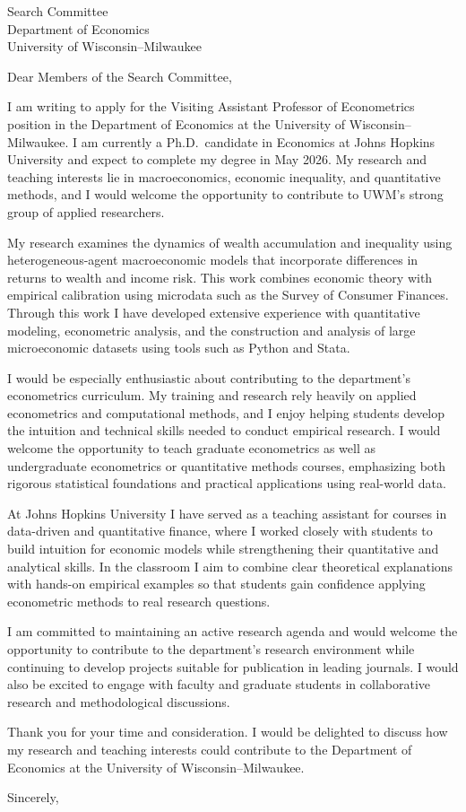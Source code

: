 \documentclass[11pt]{letter}
\begin{document}
\begin{letter}{Search Committee \\
Department of Economics \\
University of Wisconsin--Milwaukee}

\opening{Dear Members of the Search Committee,}

I am writing to apply for the Visiting Assistant Professor of Econometrics position in the Department of Economics at the University of Wisconsin--Milwaukee. I am currently a Ph.D.\ candidate in Economics at Johns Hopkins University and expect to complete my degree in May 2026. My research and teaching interests lie in macroeconomics, economic inequality, and quantitative methods, and I would welcome the opportunity to contribute to UWM’s strong group of applied researchers.

My research examines the dynamics of wealth accumulation and inequality using heterogeneous-agent macroeconomic models that incorporate differences in returns to wealth and income risk. This work combines economic theory with empirical calibration using microdata such as the Survey of Consumer Finances. Through this work I have developed extensive experience with quantitative modeling, econometric analysis, and the construction and analysis of large microeconomic datasets using tools such as Python and Stata.

I would be especially enthusiastic about contributing to the department’s econometrics curriculum. My training and research rely heavily on applied econometrics and computational methods, and I enjoy helping students develop the intuition and technical skills needed to conduct empirical research. I would welcome the opportunity to teach graduate econometrics as well as undergraduate econometrics or quantitative methods courses, emphasizing both rigorous statistical foundations and practical applications using real-world data.

At Johns Hopkins University I have served as a teaching assistant for courses in data-driven and quantitative finance, where I worked closely with students to build intuition for economic models while strengthening their quantitative and analytical skills. In the classroom I aim to combine clear theoretical explanations with hands-on empirical examples so that students gain confidence applying econometric methods to real research questions.

I am committed to maintaining an active research agenda and would welcome the opportunity to contribute to the department’s research environment while continuing to develop projects suitable for publication in leading journals. I would also be excited to engage with faculty and graduate students in collaborative research and methodological discussions.

Thank you for your time and consideration. I would be delighted to discuss how my research and teaching interests could contribute to the Department of Economics at the University of Wisconsin--Milwaukee.

\closing{Sincerely,}

\end{letter}
\end{document}
